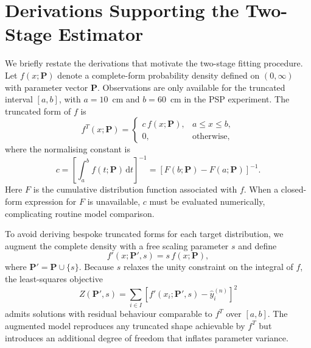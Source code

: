 \section{Derivations Supporting the Two-Stage Estimator}

We briefly restate the derivations that motivate the two-stage fitting procedure. Let $f(x; \bm{P})$ denote a complete-form probability density defined on $(0, \infty)$ with parameter vector $\bm{P}$. Observations are only available for the truncated interval $[a, b]$, with $a = 10$~cm and $b = 60$~cm in the PSP experiment. The truncated form of $f$ is
\begin{equation}
  f^{T}(x; \bm{P}) =
    \begin{cases}
      c \, f(x; \bm{P}), & a \leq x \leq b, \\
      0, & \text{otherwise},
    \end{cases}
    \label{eq:truncated-density}
\end{equation}
where the normalising constant is
\begin{equation}
  c = \left[\int_a^b f(t; \bm{P}) \,\mathrm{d}t\right]^{-1} = \left[F(b; \bm{P}) - F(a; \bm{P})\right]^{-1}.
\end{equation}
Here $F$ is the cumulative distribution function associated with $f$. When a closed-form expression for $F$ is unavailable, $c$ must be evaluated numerically, complicating routine model comparison.

To avoid deriving bespoke truncated forms for each target distribution, we augment the complete density with a free scaling parameter $s$ and define
\begin{equation}
  f'(x; \bm{P}', s) = s \, f(x; \bm{P}),
\end{equation}
where $\bm{P}' = \bm{P} \cup \{s\}$. Because $s$ relaxes the unity constraint on the integral of $f$, the least-squares objective
\begin{equation}
  Z(\bm{P}', s) = \sum_{i \in I} \left[f'(x_i; \bm{P}', s) - \hat{y}_i^{(n)}\right]^2
\end{equation}
admits solutions with residual behaviour comparable to $f^{T}$ over $[a, b]$. The augmented model reproduces any truncated shape achievable by $f^{T}$ but introduces an additional degree of freedom that inflates parameter variance.

